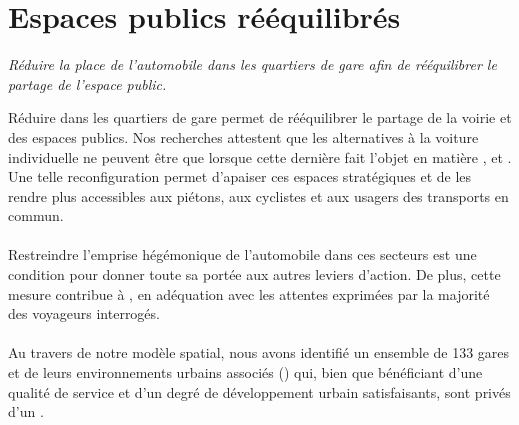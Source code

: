 \documentclass[../main.tex]{subfiles}
\begin{document}
    \newpage

    \vspace{15pt}
\section{Espaces publics rééquilibrés}

\begin{block}[Reconfigurer]
    \linespread{0.9}\selectfont %
    \textit{\small{Réduire la place de l'automobile dans les quartiers de gare afin de rééquilibrer le partage de l'espace public.}}
\end{block}

    \begin{multicols}{2}
    \raggedcolumns
    \small{
Réduire  dans les quartiers de gare permet de rééquilibrer le partage de la voirie et des espaces publics. Nos recherches attestent que les alternatives à la voiture individuelle ne peuvent être  que lorsque cette dernière fait l’objet  en matière ,  et . Une telle reconfiguration permet d’apaiser ces espaces stratégiques et de les rendre plus accessibles aux piétons, aux cyclistes et aux usagers des transports en commun.
    \\\\
Restreindre l’emprise hégémonique de l’automobile dans ces secteurs est une condition pour donner toute sa portée aux autres leviers d’action. De plus, cette mesure contribue à , en adéquation avec les attentes exprimées par la majorité des voyageurs interrogés.
    \\\\
Au travers de notre modèle spatial, nous avons identifié un ensemble de 133 gares et de leurs environnements urbains associés () qui, bien que bénéficiant d’une qualité de service et d’un degré de développement urbain satisfaisants, sont privés d'un .
    }
\begin{center}

\end{center}
\end{multicols}
\end{document}
